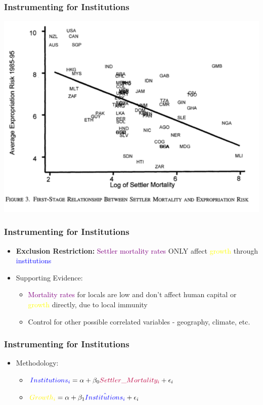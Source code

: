 \documentclass[xcolor=x11names,compress]{beamer}\usepackage[]{graphicx}\usepackage[]{color}
\renewcommand{\(}{\begin{columns}}
\renewcommand{\)}{\end{columns}}
\newcommand{\<}[1]{\begin{column}{#1}}
\renewcommand{\>}{\end{column}}
\begin{document}
\begin{frame}
\frametitle{Instrumenting for Institutions}
\includegraphics[scale=0.38]{AJR_first_stage.png}
\end{frame}

\begin{frame}
\frametitle{Instrumenting for Institutions}
\begin{itemize}
\item \textbf{Exclusion Restriction:} \pause \textcolor{purple}{Settler mortality rates} ONLY affect \textcolor{yellow}{growth} through \textcolor{blue}{institutions}
\pause
\item Supporting Evidence:
\begin{itemize}
\item \textcolor{purple}{Mortality rates} for locals are low and don't affect human capital or \textcolor{yellow}{growth} directly, due to local immunity
\pause
\item Control for other possible correlated variables - geography, climate, etc.
\end{itemize}
\end{itemize}
\end{frame}

\begin{frame}
\frametitle{Instrumenting for Institutions}
\begin{itemize}
\item Methodology:
\begin{itemize}
\item $\textcolor{blue}{Institutions_i} = \alpha + \beta_0 \textcolor{purple}{Settler\_Mortality_i} + \epsilon_i$
\item $\textcolor{yellow}{Growth_i} = \alpha + \beta_1 \textcolor{blue}{\hat{Institutions_i}} + \epsilon_i$
\end{itemize}
\end{itemize}
\end{frame}
\end{document}
